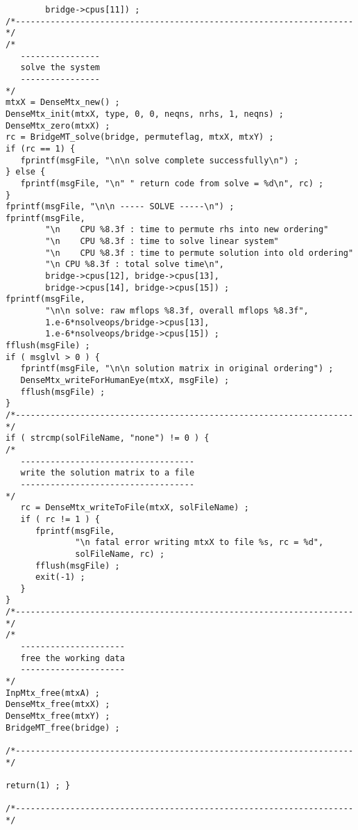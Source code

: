 \begin{verbatim}
        bridge->cpus[11]) ;
/*--------------------------------------------------------------------*/
/*
   ----------------
   solve the system
   ----------------
*/
mtxX = DenseMtx_new() ;
DenseMtx_init(mtxX, type, 0, 0, neqns, nrhs, 1, neqns) ;
DenseMtx_zero(mtxX) ;
rc = BridgeMT_solve(bridge, permuteflag, mtxX, mtxY) ;
if (rc == 1) {
   fprintf(msgFile, "\n\n solve complete successfully\n") ;
} else {
   fprintf(msgFile, "\n" " return code from solve = %d\n", rc) ;
}
fprintf(msgFile, "\n\n ----- SOLVE -----\n") ;
fprintf(msgFile, 
        "\n    CPU %8.3f : time to permute rhs into new ordering"
        "\n    CPU %8.3f : time to solve linear system"
        "\n    CPU %8.3f : time to permute solution into old ordering"
        "\n CPU %8.3f : total solve time\n",
        bridge->cpus[12], bridge->cpus[13],
        bridge->cpus[14], bridge->cpus[15]) ;
fprintf(msgFile, 
        "\n\n solve: raw mflops %8.3f, overall mflops %8.3f",
        1.e-6*nsolveops/bridge->cpus[13],
        1.e-6*nsolveops/bridge->cpus[15]) ;
fflush(msgFile) ;
if ( msglvl > 0 ) {
   fprintf(msgFile, "\n\n solution matrix in original ordering") ;
   DenseMtx_writeForHumanEye(mtxX, msgFile) ;
   fflush(msgFile) ;
}
/*--------------------------------------------------------------------*/
if ( strcmp(solFileName, "none") != 0 ) {
/*
   -----------------------------------
   write the solution matrix to a file
   -----------------------------------
*/
   rc = DenseMtx_writeToFile(mtxX, solFileName) ;
   if ( rc != 1 ) {
      fprintf(msgFile,
              "\n fatal error writing mtxX to file %s, rc = %d",
              solFileName, rc) ;
      fflush(msgFile) ;
      exit(-1) ;
   }
}
/*--------------------------------------------------------------------*/
/*
   ---------------------
   free the working data
   ---------------------
*/
InpMtx_free(mtxA) ;
DenseMtx_free(mtxX) ;
DenseMtx_free(mtxY) ;
BridgeMT_free(bridge) ;

/*--------------------------------------------------------------------*/

return(1) ; }

/*--------------------------------------------------------------------*/
\end{verbatim}
